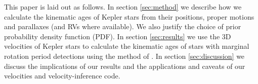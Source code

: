 This paper is laid out as follows.
In section \ref{sec:method} we describe how we calculate the kinematic ages of
Kepler stars from their positions, proper motions and parallaxes (and RVs
where available).
We also justify the choice of prior probability density function (PDF).
In section \ref{sec:results} we use the 3D velocities of Kepler stars to
calculate the kinematic ages of stars with marginal rotation period
detections using the method of \citet{lu2021}.
In section \ref{sec:discussion} we discuss the implications of our results and
the applications and caveats of our velocities and velocity-inference code.
